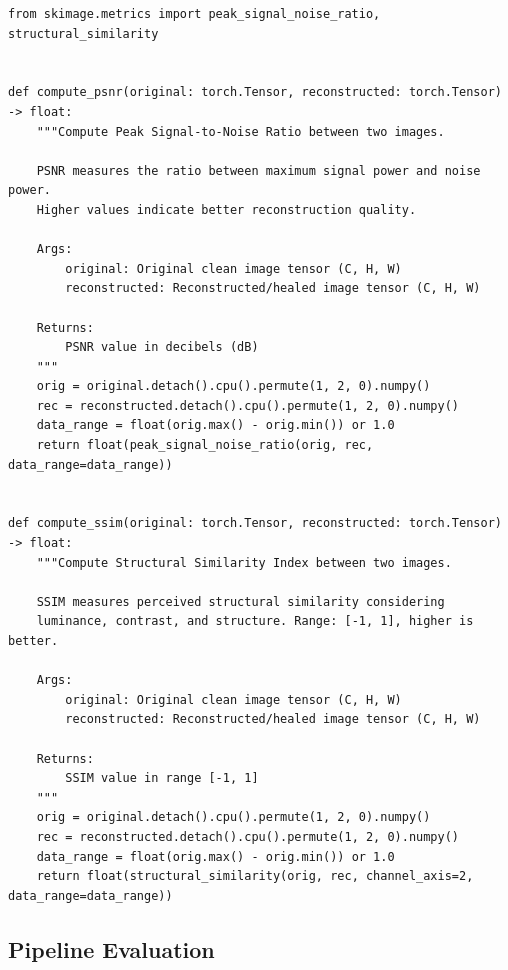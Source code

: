 \documentclass[11pt,a4paper]{article}
\begin{document}
\begin{lstlisting}[caption={src/evaluate.py - Quality Metrics}, label={lst:quality-metrics}]
from skimage.metrics import peak_signal_noise_ratio, structural_similarity


def compute_psnr(original: torch.Tensor, reconstructed: torch.Tensor) -> float:
    """Compute Peak Signal-to-Noise Ratio between two images.

    PSNR measures the ratio between maximum signal power and noise power.
    Higher values indicate better reconstruction quality.

    Args:
        original: Original clean image tensor (C, H, W)
        reconstructed: Reconstructed/healed image tensor (C, H, W)

    Returns:
        PSNR value in decibels (dB)
    """
    orig = original.detach().cpu().permute(1, 2, 0).numpy()
    rec = reconstructed.detach().cpu().permute(1, 2, 0).numpy()
    data_range = float(orig.max() - orig.min()) or 1.0
    return float(peak_signal_noise_ratio(orig, rec, data_range=data_range))


def compute_ssim(original: torch.Tensor, reconstructed: torch.Tensor) -> float:
    """Compute Structural Similarity Index between two images.

    SSIM measures perceived structural similarity considering
    luminance, contrast, and structure. Range: [-1, 1], higher is better.

    Args:
        original: Original clean image tensor (C, H, W)
        reconstructed: Reconstructed/healed image tensor (C, H, W)

    Returns:
        SSIM value in range [-1, 1]
    """
    orig = original.detach().cpu().permute(1, 2, 0).numpy()
    rec = reconstructed.detach().cpu().permute(1, 2, 0).numpy()
    data_range = float(orig.max() - orig.min()) or 1.0
    return float(structural_similarity(orig, rec, channel_axis=2, data_range=data_range))
\end{lstlisting}

\subsection{Pipeline Evaluation}
\end{document}

